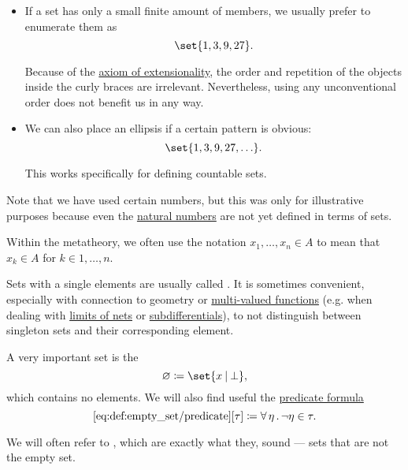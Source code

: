 \begin{definition}
\begin{itemize}
    \item If a set has only a small finite amount of members, we usually prefer to enumerate them as
    \begin{equation*}
      \set{ 1, 3, 9, 27 }.
    \end{equation*}

    Because of the \hyperref[def:naive_set_theory/extensionality]{axiom of extensionality}, the order and repetition of the objects inside the curly braces are irrelevant. Nevertheless, using any unconventional order does not benefit us in any way.

    \item We can also place an ellipsis if a certain pattern is obvious:
    \begin{equation*}
      \set{ 1, 3, 9, 27, \ldots }.
    \end{equation*}

    This works specifically for defining countable sets.
  \end{itemize}

  Note that we have used certain numbers, but this was only for illustrative purposes because even the \hyperref[def:natural_numbers]{natural numbers} are not yet defined in terms of sets.
\end{definition}

\begin{remark}\label{rem:multile_set_membership_shorthand}
  Within the metatheory, we often use the notation \( x_1, \ldots, x_n \in A \) to mean that \( x_k \in A \) for \( k \in 1, \ldots, n \).
\end{remark}

\begin{remark}\label{rem:singleton_sets}
  Sets with a single elements are usually called . It is sometimes convenient, especially with connection to geometry or \hyperref[def:multi_valued_function]{multi-valued functions} (e.g. when dealing with \hyperref[def:net_convergence/limit]{limits of nets} or \hyperref[def:subdifferentials]{subdifferentials}), to not distinguish between singleton sets and their corresponding element.
\end{remark}

\begin{definition}\label{def:empty_set}
  A very important set is the 
  \begin{equation*}
    \varnothing \coloneqq \set{ x \given \bot },
  \end{equation*}
  which contains no elements. We will also find useful the \hyperref[rem:predicate_formula]{predicate formula}
  \begin{equation*}\taglabel[\op{IsEmpty}]{eq:def:empty_set/predicate}
    \ref{eq:def:empty_set/predicate}[\tau] \coloneqq \qforall \eta \neg \eta \in \tau.
  \end{equation*}

  We will often refer to , which are exactly what they, sound --- sets that are not the empty set.
\end{definition}

